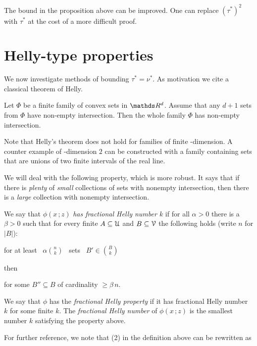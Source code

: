 \documentclass[scombinatorics.tex]{subfiles}
\begin{document}
The bound in the proposition above can be improved.
One can replace $(\tau^*)^2$ with  $\tau^*$ at the cost of a more difficult proof.

\section{Helly-type properties}

We now investigate methods of bounding $\tau^*=\nu^*$.
As motivation we cite a classical theorem of Helly.

\begin{proposition}
Let $\Phi$ be a finite family of convex sets in $\RR^d$.
Assume that any $d+1$ sets from $\Phi$ have non-empty intersection.
Then the whole family $\Phi$ has non-empty intersection.\QED
\end{proposition}

Note that Helly's theorem does not hold for families of finite \vc-dimension.
A counter example of \vc-dimension $2$ can be constructed with a family containing sets that are unions of two finite intervals of the real line.

We will deal with the following property, which is more robust. It says that if there is \textit{plenty\/} of \textit{small\/} collections of sets with nonempty intersection, then there is a \textit{large\/} collection with nonempty intersection.

\begin{definition}
We say that $\phi(x\,;z)$ \emph{has fractional Helly number $k$\/} if for all $\alpha>0$ there is a $\beta>0$ such that  for every finite $A\subseteq\EuScript U$ and $B\subseteq\EuScript V$ the following holds (write $n$ for $|B|$):

\hfill for at least \ $\displaystyle\alpha{n\choose k}$ \ sets \ $\displaystyle B'\in{B\choose k}$

then

\hfill for some $B''\subseteq B$ of cardinality $\ge\beta\,n$.

We say that $\phi$ has the \emph{fractional Helly property\/} if it has fractional Helly number $k$ for some finite $k$.
The \emph{fractional Helly number\/} of $\phi(x\,;z)$ is the smallest number $k$ satisfying the property above.\QED
\end{definition}

For further reference, we note that (2) in the definition above can be rewritten as 
\end{document}
